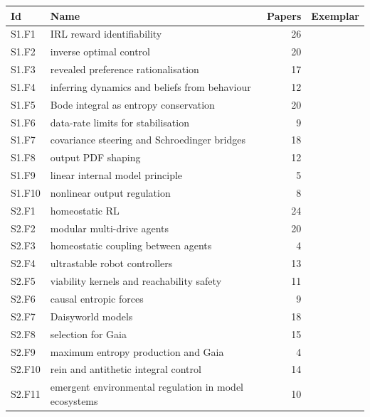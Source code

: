 \documentclass[10pt]{article}
\begin{document}
{\footnotesize
\begin{longtable}{@{}p{1.3cm}p{8.6cm}rp{4.4cm}@{}}
\textbf{Id} & \textbf{Name} & \textbf{Papers} & \textbf{Exemplar}\\
\hline\endhead
S1.F1 & IRL reward identifiability & 26 & \citet{Ng-policy99}\\
S1.F2 & inverse optimal control & 20 & \citet{Geadah-inferring24}\\
S1.F3 & revealed preference rationalisation & 17 & \citet{Afriat-construction67}\\
S1.F4 & inferring dynamics and beliefs from behaviour & 12 & \citet{Yu-joint26}\\
S1.F5 & Bode integral as entropy conservation & 20 & \citet{Bode-relations40}\\
S1.F6 & data-rate limits for stabilisation & 9 & \citet{Nair-stabilizability04}\\
S1.F7 & covariance steering and Schroedinger bridges & 18 & \citet{Hotz-covariance87}\\
S1.F8 & output PDF shaping & 12 & \citet{Wang-robust99}\\
S1.F9 & linear internal model principle & 5 & \citet{Francis-internal76}\\
S1.F10 & nonlinear output regulation & 8 & \citet{Hepburn-error84}\\
S2.F1 & homeostatic RL & 24 & \citet{Keramati-homeostatic14}\\
S2.F2 & modular multi-drive agents & 20 & \citet{Tyrrell-use93}\\
S2.F3 & homeostatic coupling between agents & 4 & \citet{Khan-effects19}\\
S2.F4 & ultrastable robot controllers & 13 & \citet{Ashby-design52}\\
S2.F5 & viability kernels and reachability safety & 11 & \citet{Massiani-safe23}\\
S2.F6 & causal entropic forces & 9 & \citet{Canessa-comment13}\\
S2.F7 & Daisyworld models & 18 & \citet{Watson-biological83}\\
S2.F8 & selection for Gaia & 15 & \citet{Lovelock-atmospheric74}\\
S2.F9 & maximum entropy production and Gaia & 4 & \citet{Ackland-maximisation03}\\
S2.F10 & rein and antithetic integral control & 14 & \citet{Clynes-cybernetic69}\\
S2.F11 & emergent environmental regulation in model ecosystems & 10 & \citet{LentonvanOijen-gaia02}\\

\end{longtable}}
\end{document}
